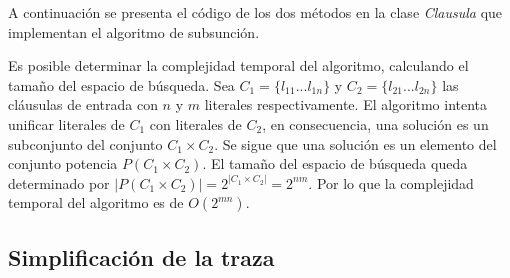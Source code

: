 \documentclass[a4paper,12pt]{article}
\begin{document}
A continuación se presenta el código de los dos métodos en la clase \emph{Clausula} que implementan
el algoritmo de subsunción.


Es posible determinar la complejidad temporal del algoritmo, calculando el tamaño del espacio de búsqueda.
Sea $C_1 = \{l_{11}...l_{1n}\}$ y $C_2 = \{l_{21}...l_{2n}\}$ las cláusulas de entrada con $n$ y $m$ literales respectivamente. 
El algoritmo intenta unificar literales de $C_1$ con literales de $C_2$, en consecuencia, una solución es un 
subconjunto del conjunto $C_1\times C_2$. Se sigue que una solución es un elemento del conjunto potencia $P(C_1\times C_2)$. 
El tamaño del espacio de búsqueda queda determinado por $\left|P(C_1\times C_2)\right|=2^{\left|C_1\times C_2\right|}=2^{nm}$. Por lo que
la complejidad temporal del algoritmo es de $O(2^{mn})$.
\subsection{Simplificación de la traza}


\end{document}
